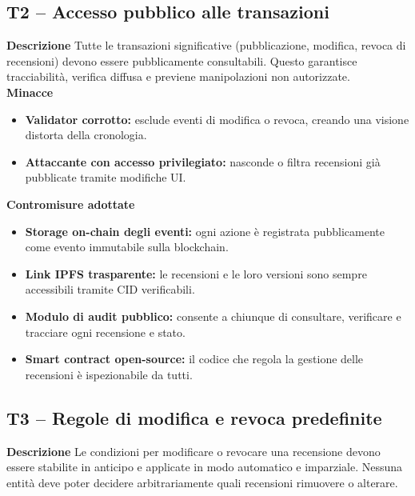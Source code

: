         \subsection{T2 – Accesso pubblico alle transazioni}
            \noindent \textbf{Descrizione}
                Tutte le transazioni significative (pubblicazione, modifica, revoca di recensioni) devono essere pubblicamente consultabili. Questo garantisce tracciabilità, verifica diffusa e previene manipolazioni non autorizzate. \\

            \noindent \textbf{Minacce}
                \begin{itemize}
                    \item \textbf{Validator corrotto:} esclude eventi di modifica o revoca, creando una visione distorta della cronologia.

                    \item \textbf{Attaccante con accesso privilegiato:} nasconde o filtra recensioni già pubblicate tramite modifiche UI.
                \end{itemize}

            \noindent \textbf{Contromisure adottate}
                \begin{itemize}
                    \item \textbf{Storage on-chain degli eventi:} ogni azione è registrata pubblicamente come evento immutabile sulla blockchain.

                    \item \textbf{Link IPFS trasparente:} le recensioni e le loro versioni sono sempre accessibili tramite CID verificabili.

                    \item \textbf{Modulo di audit pubblico:} consente a chiunque di consultare, verificare e tracciare ogni recensione e stato.

                    \item \textbf{Smart contract open-source:} il codice che regola la gestione delle recensioni è ispezionabile da tutti.
                \end{itemize}

        \subsection{T3 – Regole di modifica e revoca predefinite}
            \noindent \textbf{Descrizione}
                Le condizioni per modificare o revocare una recensione devono essere stabilite in anticipo e applicate in modo automatico e imparziale. Nessuna entità deve poter decidere arbitrariamente quali recensioni rimuovere o alterare. \\

